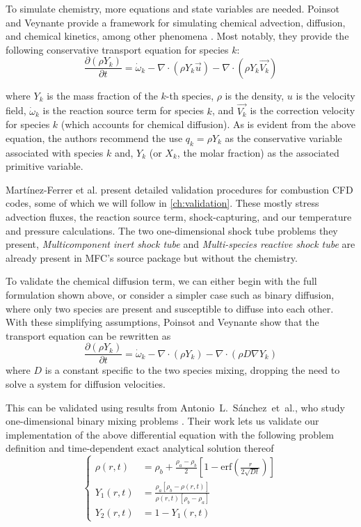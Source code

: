 To simulate chemistry, more equations and state variables are needed. Poinsot
and Veynante provide a framework for simulating chemical advection, diffusion,
and chemical kinetics, among other phenomena \cite{poinsot:hal-00270731}. Most notably,
they provide the following conservative transport equation for species $k$:
\begin{equation}
    \frac{\partial\left(\rho Y_k\right)}{\partial t} = \dot\omega_k - \nabla \cdot (\rho Y_k \Vec{u}) - \nabla \cdot (\rho Y_k \Vec{V_k})
\end{equation}

\noindent where $Y_k$ is the mass fraction of the $k$-th species, $\rho$ is the density, $u$ is the velocity field,
$\dot\omega_k$ is the reaction source term for species $k$, and $\Vec{V_k}$ is the correction velocity for species $k$
(which accounts for chemical diffusion). As is evident from the above equation, the authors recommend the use $q_k=\rho Y_k$
as the conservative variable associated with species $k$ and, $Y_k$ (or $X_k$, the molar fraction) as the associated
primitive variable.

Martínez-Ferrer et al. \cite{MARTINEZFERRER201488} present detailed
validation procedures for combustion CFD codes, some of which we will follow in
\autoref{ch:validation}. These mostly stress advection fluxes, the reaction
source term, shock-capturing, and our temperature and pressure calculations.
The two one-dimensional shock tube problems they present, \textit{Multicomponent inert shock tube}
and \textit{Multi-species reactive shock tube} are already present in MFC's source package
but without the chemistry.

To validate the chemical diffusion term, we can either begin with the full formulation
shown above, or consider a simpler case such as binary diffusion, where only two
species are present and susceptible to diffuse into each other. With these simplifying
assumptions, Poinsot and Veynante \cite{poinsot:hal-00270731} show that the
transport equation can be rewritten as
%
$$
\frac{\partial\left( \rho Y_k\right)}{\partial t} = \dot\omega_k - \nabla \cdot \left( \rho Y_k \right) - \nabla \cdot \left( \rho D \nabla Y_k \right)
$$
%
\noindent where $D$ is a constant specific to the two species mixing, dropping the need to
solve a system for diffusion velocities.

This can be validated using results from Antonio~L.~Sánchez~et~al., who study
one-dimensional binary mixing problems \cite{10.1063/1.2221349}. Their work lets
us validate our implementation of the above differential equation with the
following problem definition and time-dependent exact analytical solution thereof
%
$$
\begin{cases}
    \rho\left(r,t\right) &= \rho_b + \frac{\rho_a-\rho_b}{2} \left[1-\text{erf}\left(\frac{r}{2\sqrt{Dt}}\right)\right] \\
    Y_1(r,t) &= \frac{\rho_a\left[\rho_b-\rho(r,t)\right]}{\rho(r,t)\left[\rho_b-\rho_a\right]} \\
    Y_2(r,t) &= 1 - Y_1(r,t)
\end{cases}
$$

